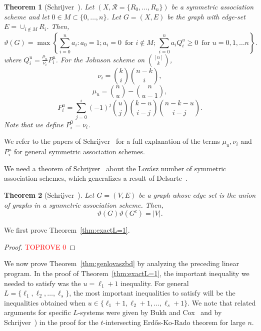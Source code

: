 \documentclass[11pt]{article}
\newtheorem{theorem}{Theorem}[section]
\theoremstyle{definition}
\theoremstyle{remark}
\begin{document}
\begin{theorem}[Schrijver~\cite{Sch1979}]\label{thm:schlp}
Let $(X, \mathcal{R} = \{R_0, \ldots, R_n\})$ be a symmetric association scheme and let $0\in M \subset \{0, \ldots, n\}$. Let $G = (X, E)$ be the graph with edge-set $E = \cup_{i\notin M} R_i$. Then, 
\begin{equation}\label{eqn:schlp}
\vartheta(G) = \max\left\{\sum_{i=0}^na_i : a_0 = 1; a_i =0\, \text{ for } i\notin M; \, \sum_{i=0}^na_iQ_i^u\ge 0\, \text{ for } u=0, 1, \ldots n\right\}.
\end{equation}
where $Q_i^u = \frac{\mu_u}{\nu_i}P_i^u$. For the Johnson scheme on $\binom{[n]}{k}$, 
\[\nu_i = \binom{k}{i}\binom{n-k}{i},\]
\[\mu_u = \binom{n}{u} - \binom{n}{u-1},\]
\[P_i^u = \sum_{j=0}^i (-1)^j \binom{u}{j} \binom{k-u}{i-j}\binom{n-k-u}{i-j}.\]
Note that we define $P_i^0 = \nu_i$. 
\end{theorem} 

We refer to the papers of Schrijver~\cite{Sch1979, Sch1978} for a full explanation of the terms $\mu_u, \nu_i$ and $P_i^u$ for general symmetric association schemes.

We need a theorem of Schrijver~\cite{Sch1979} about the Lov\'asz number of symmetric association schemes, which generalizes a result of Delsarte~\cite{Del1973}. 

\begin{theorem}[Schrijver~\cite{Sch1979}]\label{thm:schprodthm}
Let $G = (V, E)$ be a graph whose edge set is the union of graphs in a symmetric association scheme. Then, 
\[\vartheta(G)\vartheta(G^c) = |V|.\]
\end{theorem}

We first prove Theorem~\ref{thm:exactL=1}. 

\begin{proof}\textcolor{red}{TOPROVE 0}\end{proof}

We now prove Theorem~\ref{thm:genlovaszbd} by analyzing the preceding linear program. In the proof of Theorem~\ref{thm:exactL=1}, the important inequality we needed to satisfy was the $u=\ell_1+1$ inequality. For general $L=\{\ell_1, \ell_2, \ldots, \ell_s\}$, the most important inequalities to satisfy will be the inequalities obtained when $u \in \{\ell_1+1, \ell_2+1, \ldots, \ell_s+1\}$. We note that related arguments for specific $L$-systems were given by Bukh and Cox~\cite[Lemma 12 (2)]{BuCo2019} and by Schrijver~\cite{Sch1978}) in the proof for the $t$-intersecting Erd\H{o}s-Ko-Rado theorem for large $n$. 
\end{document}
